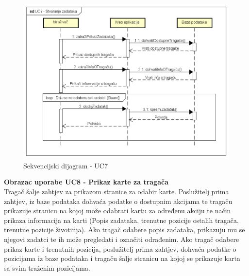 				
				\begin{figure}[H]
					\includegraphics[scale=0.7]{slike/UC7_sekv.PNG} %
					\centering
					\caption{Sekvencijski dijagram - UC7}
					\label{fig:promjene}
				\end{figure}
				\eject
				
				\noindent \textbf{Obrazac uporabe UC8 - Prikaz karte za tragača}\\
				
				\noindent Tragač šalje zahtjev za prikazom stranice za odabir karte. Poslužitelj prima zahtjev, iz baze podataka dohvaća podatke o dostupnim akcijama te tragaču prikazuje stranicu na kojoj može odabrati kartu za određenu akciju te način prikaza informacija na karti (Popis zadataka, trenutne pozicije ostalih tragača, trenutne pozicije životinja). Ako tragač odabere popis zadataka, prikazuju mu se njegovi zadatci te ih može pregledati i označiti odrađenim. Ako tragač odabere prikaz karte i trenutnih pozicija, poslužitelj prima zahtjev, dohvaća podatke o pozicijama iz baze podataka i tragaču šalje stranicu na kojoj se prikazuje karta sa svim traženim pozicijama.
				
